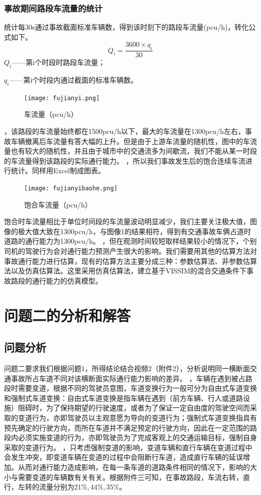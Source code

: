 \documentclass[UTF8,12.05pt]{ctexart}
\begin{document}
\subsubsection{事故期间路段车流量的统计}
统计每30s通过事故截面标准车辆数，得到该时刻下的路段车流量(pcu/h)，转化公式如下。
$$Q_{i}=\frac{3600\times q_{i}}{30}$$
$Q_{i}$——第i个时段时路段车流量；
\par$q_{i}$——第i个时段内通过截面的标准车辆数。
\begin{figure}[H]
  \centering
  \texttt{[image: fujianyi.png]}
  \caption{车流量（pcu/h）}
\end{figure}
，该路段的车流量始终都在1500pcu/h以下，最大的车流量在1300pcu/h左右，事故车辆撤离后车流量有答大幅的上升。但是由于上游车流量的随机性，图中的车流量也有较大的随机性，并且由于城市中的交通流多为间歇流，我们不能从某一时段的车流量得到该路段的实际通行能力。
\newline
{}，所以我们事故发生后的饱合连续车流进行统计。同样用Excel制成图表。
\begin{figure}[H]
  \centering
  \texttt{[image: fujianyibaohe.png]}
  \caption{饱合车流量（pcu/h）}
\end{figure}
饱合时车流量相比于单位时间段的车流量波动明显减少，我们主要关注极大值，图像的极大值大致在1300pcu/h，与图像1的结果相符，得到有交通事故车俩占道时道路的通行能力为1300pcu/h。
\newline
{}，但在观测时间较短取样结果较小的情况下，个别司机的驾驶行为会对通行能力预测产生很大的影响。我们需要用其他的估算方法对事故通行能力进行估算，现有的估算方法主要分成三种：参数估算法、非参数估算法以及仿真估算法。这里采用仿真估算法，建立基于VISSIM的混合交通条件下事故路段的通行能力的仿真模型。
\section{\heiti{}问题二的分析和解答}
\subsection{问题分析}
问题二要求我们根据问题1，所得结论结合视频2（附件2），分析说明同一横断面交通事故所占车道不同对该横断面实际通行能力影响的差异。
，车辆在遇到被占路段时需要变道，根据不同的驾驶员意图，车道变换行为一般可分为自由式车道变换和强制式车道变换：自由式车道变换是指车辆在遇到（前方车辆、行人或道路设施）阻碍时，为了保持期望的行驶速度，或者为了保证一定自由度的驾驶空间而采取的变道行为，亦即驾驶员以主观意愿为导向的变道行为；强制式车道变换指具有预先确定的行驶方向，而所在车道并不满足预定的行驶方向，因此在一定范围的路段内必须实施变道的行为，亦即驾驶员为了完成客观上的交通运输目标，强制自身
采取的变道行为\cite{cell}。
，只考虑强制变道的影响，变道车辆和直行车辆在变道过程中会发生冲突，即变道车辆在变道的过程中会阻断行车道，造成直行车辆的延误增加。从而对通行能力造成影响，在每一条车道的道路条件相同的情况下，影响的大小与需要变道的车辆数有关有关。根据附件三可知，在事故路段，车流右转，直行，左转的流量分别为$21\%, 44\%, 35\%$。
\end{document}
